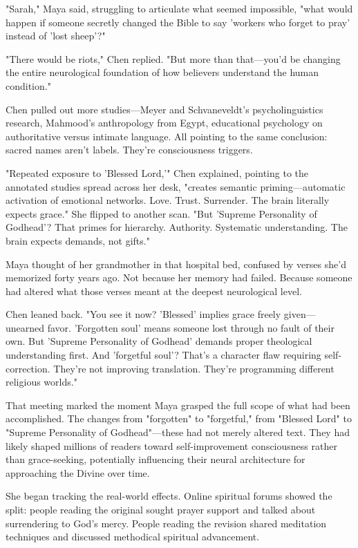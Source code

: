 \documentclass[12pt,twoside]{book}
\begin{document}
"Sarah," Maya said, struggling to articulate what seemed impossible, "what would happen if someone secretly changed the Bible to say 'workers who forget to pray' instead of 'lost sheep'?"

"There would be riots," Chen replied. "But more than that—you'd be changing the entire neurological foundation of how believers understand the human condition."

Chen pulled out more studies—Meyer and Schvaneveldt's psycholinguistics research, Mahmood's anthropology from Egypt, educational psychology on authoritative versus intimate language. All pointing to the same conclusion: sacred names aren't labels. They're consciousness triggers.

"Repeated exposure to 'Blessed Lord,'" Chen explained, pointing to the annotated studies spread across her desk, "creates semantic priming—automatic activation of emotional networks. Love. Trust. Surrender. The brain literally expects grace." She flipped to another scan. "But 'Supreme Personality of Godhead'? That primes for hierarchy. Authority. Systematic understanding. The brain expects demands, not gifts."

Maya thought of her grandmother in that hospital bed, confused by verses she'd memorized forty years ago. Not because her memory had failed. Because someone had altered what those verses meant at the deepest neurological level.

Chen leaned back. "You see it now? 'Blessed' implies grace freely given—unearned favor. 'Forgotten soul' means someone lost through no fault of their own. But 'Supreme Personality of Godhead' demands proper theological understanding first. And 'forgetful soul'? That's a character flaw requiring self-correction. They're not improving translation. They're programming different religious worlds."

That meeting marked the moment Maya grasped the full scope of what had been accomplished. The changes from "forgotten" to "forgetful," from "Blessed Lord" to "Supreme Personality of Godhead"—these had not merely altered text. They had likely shaped millions of readers toward self-improvement consciousness rather than grace-seeking, potentially influencing their neural architecture for approaching the Divine over time.

She began tracking the real-world effects. Online spiritual forums showed the split: people reading the original sought prayer support and talked about surrendering to God's mercy. People reading the revision shared meditation techniques and discussed methodical spiritual advancement.
\end{document}
